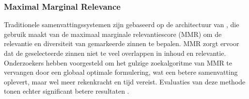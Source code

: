 


\subsubsection{Maximal Marginal Relevance}

Traditionele samenvattingssystemen zijn gebaseerd op de architectuur van \textcite{Carbonell1998}, die gebruik maakt van de maximaal marginale relevantiescore (MMR) om de relevantie en diversiteit van gemarkeerde zinnen te bepalen. MMR zorgt ervoor dat de geselecteerde zinnen niet te veel overlappen in inhoud en relevantie. Onderzoekers hebben voorgesteld om het gulzige zoekalgoritme van MMR te vervangen door een globaal optimale formulering, wat een betere samenvatting oplevert, maar wel meer rekenkracht en tijd vereist. Evaluaties van deze methode tonen echter significant betere resultaten \textcite{McDonald2007, Lin2010}.

